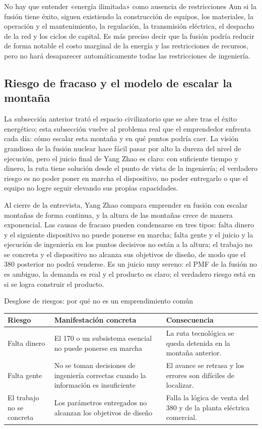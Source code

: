 \documentclass[a4paper]{article}
\begin{document}
\begin{warningbox}{No hay que entender «energía ilimitada» como ausencia de restricciones}
Aun si la fusión tiene éxito, siguen existiendo la construcción de equipos, los materiales, la operación y el mantenimiento, la regulación, la transmisión eléctrica, el despacho de la red y los ciclos de capital. Es más preciso decir que la fusión podría reducir de forma notable el costo marginal de la energía y las restricciones de recursos, pero no hará desaparecer automáticamente todas las restricciones de ingeniería.
\end{warningbox}

\subsection{Riesgo de fracaso y el modelo de escalar la montaña}

La subsección anterior trató el espacio civilizatorio que se abre tras el éxito energético; esta subsección vuelve al problema real que el emprendedor enfrenta cada día: cómo escalar esta montaña y en qué puntos podría caer. La visión grandiosa de la fusión nuclear hace fácil pasar por alto la dureza del nivel de ejecución, pero el juicio final de Yang Zhao es claro: con suficiente tiempo y dinero, la ruta tiene solución desde el punto de vista de la ingeniería; el verdadero riesgo es no poder poner en marcha el dispositivo, no poder entregarlo o que el equipo no logre seguir elevando sus propias capacidades.

Al cierre de la entrevista, Yang Zhao compara emprender en fusión con escalar montañas de forma continua, y la altura de las montañas crece de manera exponencial. Las causas de fracaso pueden condensarse en tres tipos: falta dinero y el siguiente dispositivo no puede ponerse en marcha; falta gente y el juicio y la ejecución de ingeniería en los puntos decisivos no están a la altura; el trabajo no se concreta y el dispositivo no alcanza sus objetivos de diseño, de modo que el 380 posterior no podrá venderse. Es un juicio muy sereno: el PMF de la fusión no es ambiguo, la demanda es real y el producto es claro; el verdadero riesgo está en si se logra construir el producto.

\begin{knowledgebox}{Desglose de riesgos: por qué no es un emprendimiento común}
\begin{tabularx}{\textwidth}{p{}p{}X}
\toprule
Riesgo & Manifestación concreta & Consecuencia \\
\midrule
Falta dinero & El 170 o un subsistema esencial no puede ponerse en marcha & La ruta tecnológica se queda detenida en la montaña anterior. \\
Falta gente & No se toman decisiones de ingeniería correctas cuando la información es insuficiente & El avance se retrasa y los errores son difíciles de localizar. \\
El trabajo no se concreta & Los parámetros entregados no alcanzan los objetivos de diseño & Falla la lógica de venta del 380 y de la planta eléctrica comercial. \\
\bottomrule
\end{tabularx}
\end{knowledgebox}
\end{document}
